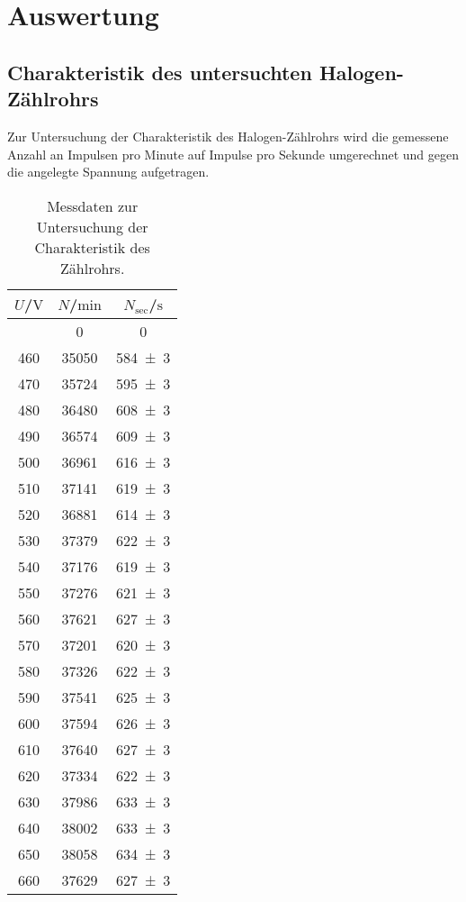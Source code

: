 \section{Auswertung}
\label{sec:Auswertung}
\subsection{Charakteristik des untersuchten Halogen-Zählrohrs}
Zur Untersuchung der Charakteristik des Halogen-Zählrohrs wird die gemessene Anzahl an Impulsen pro Minute auf Impulse pro Sekunde umgerechnet und gegen die angelegte Spannung aufgetragen.


\begin{longtable}{ccc}
  \caption{Messdaten zur Untersuchung der Charakteristik des Zählrohrs.}\label{tab:atab}\\
\toprule
$U$/$\si{\volt}$ &$N$/$\si{\minute}$&$N_\mathrm{sec}$/$\si{\second}$ \\
\midrule
\endhead
\midrule
\endfoot
450  & 0& 0  \\
460  & 35050  & \num{584(3)}\\
470  & 35724  & \num{595(3)}\\
480  & 36480  & \num{608(3)}\\
490  & 36574  & \num{609(3)}\\
500  & 36961  & \num{616(3)}\\
510  & 37141  & \num{619(3)}\\
520  & 36881  & \num{614(3)}\\
530  & 37379  & \num{622(3)}\\
540  & 37176  & \num{619(3)}\\
550  & 37276  & \num{621(3)}\\
560  & 37621  & \num{627(3)}\\
570  & 37201  & \num{620(3)}\\
580  & 37326  & \num{622(3)}\\
590  & 37541  & \num{625(3)}\\
600  & 37594  & \num{626(3)}\\
610  & 37640  & \num{627(3)}\\
620  & 37334  & \num{622(3)}\\
630  & 37986  & \num{633(3)}\\
640  & 38002  & \num{633(3)}\\
650  & 38058  & \num{634(3)}\\
660  & 37629  & \num{627(3)}\\

\end{longtable}
